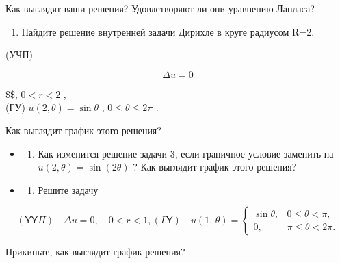 \documentclass[
  ukrainian,
]{article}
\providecommand{\tightlist}{%
  \setlength{\itemsep}{0pt}\setlength{\parskip}{0pt}}
\begin{document}
Как выглядят ваши решения? Удовлетворяют ли они уравнению Лапласа?

\begin{enumerate}
\def\labelenumi{\arabic{enumi}.}
\setcounter{enumi}{2}
\tightlist
\item
  Найдите решение внутренней задачи Дирихле в круге радиусом R=2.
\end{enumerate}

(УЧП)

\[
\Delta u = 0
\]

\$\$, \(0 < r < 2\) ,\\
(ГУ) \(u(2, \theta) = \sin \theta\) , \(0 \le \theta \le 2\pi\) .

Как выглядит график этого решения?

\begin{itemize}
\tightlist
\item
  \begin{enumerate}
  \def\labelenumi{\arabic{enumi}.}
  \setcounter{enumi}{3}
  \tightlist
  \item
    Как изменится решение задачи 3, если граничное условие заменить на
    \(u(2, \theta) = \sin(2\theta)\) ? Как выглядит график этого
    решения?
  \end{enumerate}
\item
  \begin{enumerate}
  \def\labelenumi{\arabic{enumi}.}
  \setcounter{enumi}{4}
  \tightlist
  \item
    Решите задачу
  \end{enumerate}
\end{itemize}

\[
(\mathsf{Y}\mathsf{Y}\mathsf{\Pi}) \quad \Delta u = 0, \quad 0 < r < 1,
(\mathsf{\Gamma}\mathsf{Y}) \quad u(1, \, \theta) = \begin{cases} \sin \theta, & 0 \le \theta < \pi, \\ 0, & \pi \le \theta < 2\pi. \end{cases}
\]

Прикиньте, как выглядит график решения?
\end{document}
